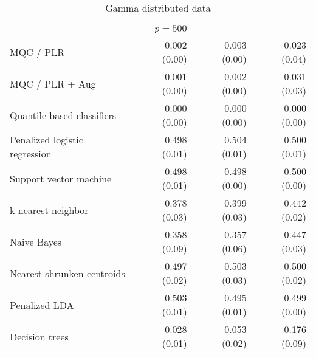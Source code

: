 \begin{table}[p]
\begin{adjustbox}{max size={\textwidth}{10cm}}
\begin{tabular}{l@{\extracolsep{15mm}}rrr}
      \hline
      & $p = 500$ \\
      \hline

      MQC / PLR & 0.002 (0.00) & 0.003 (0.00) & 0.023 (0.04) \\ 
      MQC / PLR + Aug & 0.001 (0.00) & 0.002 (0.00) & 0.031 (0.03) \\ 
      Quantile-based classifiers & 0.000 (0.00) & 0.000 (0.00) & 0.000 (0.00) \\ 
      Penalized logistic regression & 0.498 (0.01) & 0.504 (0.01) & 0.500 (0.01) \\ 
      Support vector machine & 0.498 (0.01) & 0.498 (0.00) & 0.500 (0.00) \\ 
      k-nearest neighbor & 0.378 (0.03) & 0.399 (0.03) & 0.442 (0.02) \\ 
      Naive Bayes & 0.358 (0.09) & 0.357 (0.06) & 0.447 (0.03) \\ 
      Nearest shrunken centroids & 0.497 (0.02) & 0.503 (0.03) & 0.500 (0.02) \\ 
      Penalized LDA & 0.503 (0.01) & 0.495 (0.01) & 0.499 (0.00) \\ 
      Decision trees & 0.028 (0.01) & 0.053 (0.02) & 0.176 (0.09) \\ 
      \hline
      
    \end{tabular}
  \end{adjustbox}
  \caption{Gamma distributed data}
\end{table}





